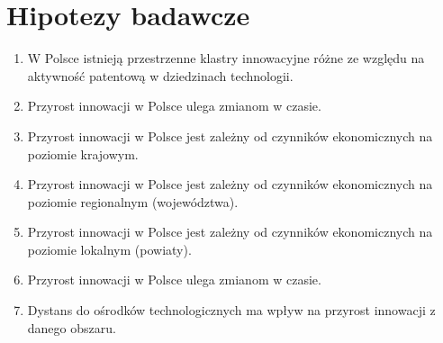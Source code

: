 \section{Hipotezy badawcze}

  \begin{enumerate}

\item
W Polsce istnieją przestrzenne klastry innowacyjne różne ze 
względu na aktywność patentową w dziedzinach technologii.



\item
Przyrost innowacji w Polsce ulega zmianom w czasie.



\item
Przyrost innowacji w Polsce jest zależny od czynników ekonomicznych 
na poziomie krajowym.



\item
Przyrost innowacji w Polsce jest zależny od czynników ekonomicznych 
na poziomie regionalnym (województwa).



\item
Przyrost innowacji w Polsce jest zależny od czynników ekonomicznych 
na poziomie lokalnym (powiaty).



\item
Przyrost innowacji w Polsce ulega zmianom w czasie.



\item
Dystans do ośrodków technologicznych ma wpływ na przyrost innowacji 
z danego obszaru.

\end{enumerate}